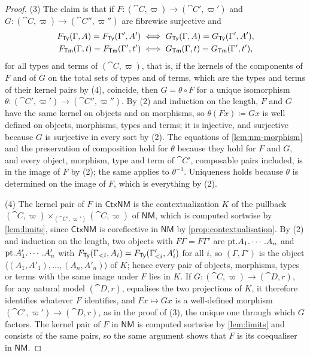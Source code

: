 \begin{proof}
    (3) The claim is that if $F : (\cat{C}, \varpi) \to (\cat{C}', \varpi')$ and $G : (\cat{C}, \varpi) \to (\cat{C}'', \varpi'')$ are fibrewise surjective and
    \begin{gather*}
        F_{\mathsf{Ty}}(\Gamma, A) = F_{\mathsf{Ty}}(\Gamma', A') \iff G_{\mathsf{Ty}}(\Gamma, A) = G_{\mathsf{Ty}}(\Gamma', A'),\\
        F_{\mathsf{Tm}}(\Gamma, t) = F_{\mathsf{Tm}}(\Gamma', t') \iff G_{\mathsf{Tm}}(\Gamma, t) = G_{\mathsf{Tm}}(\Gamma', t'),
    \end{gather*}
    for all types and terms of $(\cat{C}, \varpi)$, that is, if the kernels of the components of $F$ and of $G$ on the total sets of types and of terms, which are the types and terms of their kernel pairs by (4), coincide, then $G = \theta \circ F$ for a unique isomorphism $\theta : (\cat{C}', \varpi') \to (\cat{C}'', \varpi'')$. By (2) and induction on the length, $F$ and $G$ have the same kernel on objects and on morphisms, so $\theta(Fx) \coloneqq Gx$ is well defined on objects, morphisms, types and terms; it is injective, and surjective because $G$ is surjective in every sort by (2). The equations of \cref{lem:nm-morphism} and the preservation of composition hold for $\theta$ because they hold for $F$ and $G$, and every object, morphism, type and term of $\cat{C}'$, composable pairs included, is in the image of $F$ by (2); the same applies to $\theta^{-1}$. Uniqueness holds because $\theta$ is determined on the image of $F$, which is everything by (2).

    (4) The kernel pair of $F$ in $\mathsf{CtxNM}$ is the contextualization $K$ of the pullback $(\cat{C}, \varpi) \times_{(\cat{C}', \varpi')} (\cat{C}, \varpi)$ of $\mathsf{NM}$, which is computed sortwise by \cref{lem:limits}, since $\mathsf{CtxNM}$ is coreflective in $\mathsf{NM}$ by \cref{prop:contextualisation}. By (2) and induction on the length, two objects with $F\Gamma = F\Gamma'$ are $\mathrm{pt}.A_1.\cdots.A_n$ and $\mathrm{pt}.A'_1.\cdots.A'_n$ with $F_{\mathsf{Ty}}(\Gamma_{<i}, A_i) = F_{\mathsf{Ty}}(\Gamma'_{<i}, A'_i)$ for all $i$, so $(\Gamma, \Gamma')$ is the object $\langle (A_1, A'_1), \ldots, (A_n, A'_n) \rangle$ of $K$; hence every pair of objects, morphisms, types or terms with the same image under $F$ lies in $K$. If $G : (\cat{C}, \varpi) \to (\cat{D}, r)$, for any natural model $(\cat{D}, r)$, equalises the two projections of $K$, it therefore identifies whatever $F$ identifies, and $Fx \mapsto Gx$ is a well-defined morphism $(\cat{C}', \varpi') \to (\cat{D}, r)$, as in the proof of (3), the unique one through which $G$ factors. The kernel pair of $F$ in $\mathsf{NM}$ is computed sortwise by \cref{lem:limits} and consists of the same pairs, so the same argument shows that $F$ is its coequaliser in $\mathsf{NM}$.
\end{proof}


